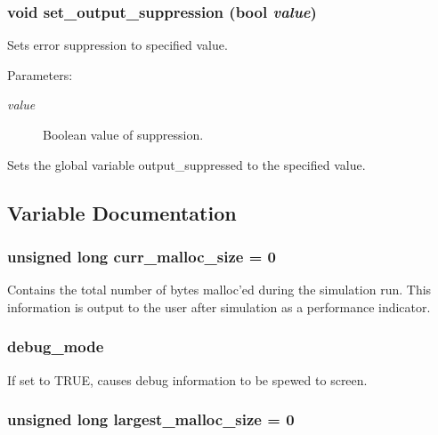 \subsubsection{\setlength{\rightskip}{0pt plus 5cm}void set\_\-output\_\-suppression ({\bf bool} {\em value})}\label{util_8c_a5}


Sets error suppression to specified value.

\begin{Desc}
\item[Parameters:]
\begin{description}
\item[{\em value}]Boolean value of suppression.\end{description}
\end{Desc}
Sets the global variable output\_\-suppressed to the specified value. 

\subsection{Variable Documentation}
\subsubsection{\setlength{\rightskip}{0pt plus 5cm}unsigned long curr\_\-malloc\_\-size = 0}\label{util_8c_a2}


Contains the total number of bytes malloc'ed during the simulation run. This information is output to the user after simulation as a performance indicator. 
\subsubsection{ debug\_\-mode}\label{util_8c_a1}


If set to TRUE, causes debug information to be spewed to screen. 
\subsubsection{\setlength{\rightskip}{0pt plus 5cm}unsigned long largest\_\-malloc\_\-size = 0}\label{util_8c_a3}


